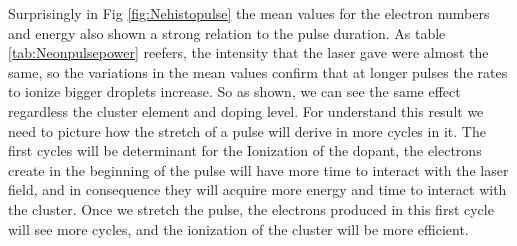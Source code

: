 Surprisingly in Fig \ref{fig:Nehistopulse} the mean values for the electron numbers and energy also shown a strong relation to the pulse duration. As table \ref{tab:Neonpulsepower} reefers, the intensity that the laser gave were almost the same, so the variations in the mean values confirm that at longer pulses the rates to ionize bigger droplets increase. So as shown, we can see the same effect regardless the cluster element and doping level. For understand this result we need to picture how the stretch of a pulse will derive in more cycles in it. The first cycles will be determinant for the Ionization of the dopant, the electrons create in the beginning of the pulse will have more time to interact with the laser field, and in consequence they will acquire more energy and time to interact with the cluster. Once we stretch the pulse, the electrons produced in this first cycle will see more cycles, and the ionization of the cluster will be more efficient. 






